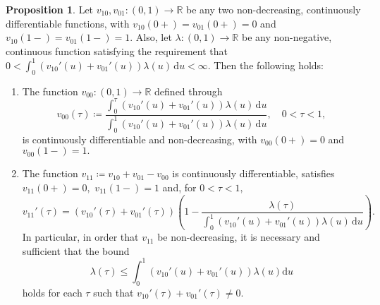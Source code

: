 \documentclass[12pt,fleqn]{article}
\theoremstyle{definition}
\newtheorem{proposition}{Proposition}
\newcommand{\dd}{\mathrm{d}}
\renewcommand{\le}{\leqslant}
\newcommand{\R}{\mathbb{R}}
\begin{document}
\begin{proposition}\label{prop:vertex-through-lambda}
Let $v_{10},v_{01}\colon(0,1)\to\R$ be any two non-decreasing, continuously differentiable functions, with $v_{10}(0+)=v_{01}(0+)=0$ and $v_{10}(1-)=v_{01}(1-)=1.$ Also, let $\lambda\colon (0,1)\to \R$ be any non-negative, continuous function satisfying the requirement that
\begin{math}
0<\int_0^1 (v_{10}'(u) + v_{01}'(u))\lambda(u)\,\dd u < \infty.
\end{math}
Then the following holds:
\begin{enumerate}[noitemsep]
\item The function $v_{00}\colon(0,1)\to\R$ defined through
\begin{equation}\label{eq:v00-good}
v_{00}(\tau) \coloneqq \frac{\int_0^\tau (v_{10}'(u)+v_{01}'(u))\lambda(u)\,\dd u}{\int_0^1 (v_{10}'(u)+v_{01}'(u))\lambda(u)\,\dd u},\quad 0<\tau<1,
\end{equation}
is continuously differentiable and non-decreasing, with $v_{00}(0+)=0$ and $v_{00}(1-)=1.$
\item The function $v_{11}\coloneqq v_{10}+v_{01}-v_{00}$ is continuously differentiable, satisfies $v_{11}(0+)=0,$ $v_{11}(1-)=1$ and, for $0<\tau<1,$
\begin{equation}\label{eq:v11-prime}
v_{11}'(\tau) = (v_{10}'(\tau) + v_{01}'(\tau))\left(1 - \frac{\lambda(\tau)}{\int_0^1 (v_{10}'(u)+v_{01}'(u))\lambda(u)\,\dd u}\right).
\end{equation}
In particular, in order that $v_{11}$ be non-decreasing, it is necessary and sufficient that the bound \begin{displaymath}\lambda(\tau)\le \int_0^1 (v_{10}'(u)+v_{01}'(u))\lambda(u)\dd u\end{displaymath} holds for each $\tau$ such that $v_{10}'(\tau) + v_{01}'(\tau)\ne0.$
\end{enumerate}
\end{proposition}
\end{document}
